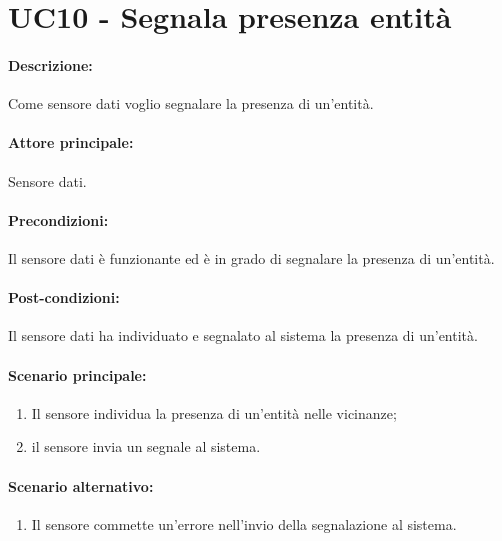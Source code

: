 \section{UC10 - Segnala presenza entità}

\paragraph{Descrizione:}
Come sensore dati voglio segnalare la presenza di un'entità.

\paragraph{Attore principale:}
Sensore dati.

\paragraph{Precondizioni:}
Il sensore dati è funzionante ed è in grado di segnalare la presenza di un'entità.

\paragraph{Post-condizioni:}
Il sensore dati ha individuato e segnalato al sistema la presenza di un'entità.

\paragraph{Scenario principale:}
\begin{enumerate}
    \item Il sensore individua la presenza di un'entità nelle vicinanze;
    \item il sensore invia un segnale al sistema.
\end{enumerate}

\paragraph{Scenario alternativo:}
\begin{enumerate}
    \item Il sensore commette un'errore nell'invio della segnalazione al sistema.
\end{enumerate}
